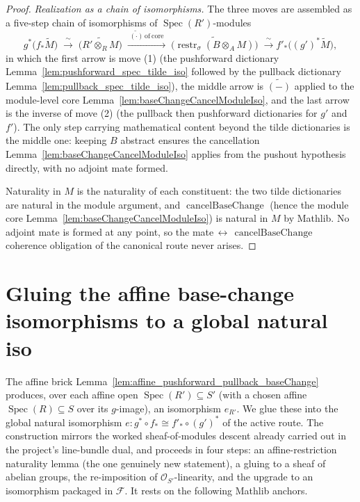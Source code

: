 \begin{proof}
  \medskip
  \emph{Realization as a chain of isomorphisms.} The three moves are assembled as a
  five-step chain of isomorphisms of \(\operatorname{Spec}(R')\)-modules
  \[
    g^*\bigl(f_*\widetilde{M}\bigr)
    \;\xrightarrow{\;\sim\;}\; \widetilde{\bigl(R' \otimes_R M\bigr)}
    \;\xrightarrow{\;\widetilde{(\cdot)}\,\mathrm{of\ core}\;}\;
    \widetilde{\bigl(\operatorname{restr}_\sigma(B \otimes_A M)\bigr)}
    \;\xrightarrow{\;\sim\;} f'_*\bigl((g')^*\widetilde{M}\bigr),
  \]
  in which the first arrow is move (1) (the pushforward dictionary
  Lemma~\ref{lem:pushforward_spec_tilde_iso} followed by the pullback dictionary
  Lemma~\ref{lem:pullback_spec_tilde_iso}), the middle arrow is \(\widetilde{(-)}\)
  applied to the module-level core Lemma~\ref{lem:baseChangeCancelModuleIso}, and the
  last arrow is the inverse of move (2) (the pullback then pushforward dictionaries for
  \(g'\) and \(f'\)). The only step carrying mathematical content beyond the tilde
  dictionaries is the middle one: keeping \(B\) abstract ensures the cancellation
  Lemma~\ref{lem:baseChangeCancelModuleIso} applies from the pushout hypothesis
  directly, with no adjoint mate formed.

  Naturality in \(M\) is the naturality of each constituent: the two tilde dictionaries
  are natural in the module argument, and \(\operatorname{cancelBaseChange}\) (hence the
  module core Lemma~\ref{lem:baseChangeCancelModuleIso}) is natural in \(M\) by Mathlib.
  No adjoint mate is formed at any point, so the
  mate\(\,\leftrightarrow\,\operatorname{cancelBaseChange}\) coherence obligation of the
  canonical route never arises.
\end{proof}

\section{Gluing the affine base-change isomorphisms to a global natural iso}
\label{sec:fbc_gluing}

The affine brick Lemma~\ref{lem:affine_pushforward_pullback_baseChange} produces, over
each affine open \(\operatorname{Spec}(R') \subseteq S'\) (with a chosen affine
\(\operatorname{Spec}(R) \subseteq S\) over its \(g\)-image), an isomorphism
\(e_{R'}\). We glue these into the global natural isomorphism
\(e : g^* \circ f_* \cong f'_* \circ (g')^*\) of the active route. The construction
mirrors the worked sheaf-of-modules descent already carried out in the project's
line-bundle dual, and proceeds in four steps: an affine-restriction naturality lemma
(the one genuinely new statement), a gluing to a sheaf of abelian groups, the
re-imposition of \(\mathcal{O}_{S'}\)-linearity, and the upgrade to an isomorphism
packaged in \(\mathcal{F}\). It rests on the following Mathlib anchors.

